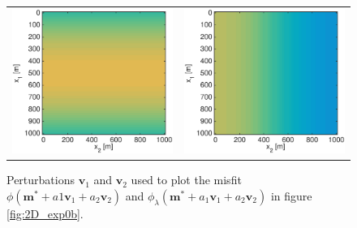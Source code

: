\documentclass{iopart}
\begin{document}
\begin{figure}
\centering
\begin{tabular}{cc}
\includegraphics[scale=.2]{./figs/2D_exp0_a}&
\includegraphics[scale=.2]{./figs/2D_exp0_e}\\
\end{tabular}
\caption{Perturbations $\mathbf{v}_1$ and $\mathbf{v}_2$ used to plot the misfit $\phi(\mathbf{m}^* + a1\mathbf{v}_1 + a_2\mathbf{v}_2)$ and $\phi_{\lambda}(\mathbf{m}^* + a_1\mathbf{v}_1 + a_2\mathbf{v}_2)$ in figure \ref{fig:2D_exp0b}.}
\label{fig:2D_exp0a}
\end{figure}
\end{document}
